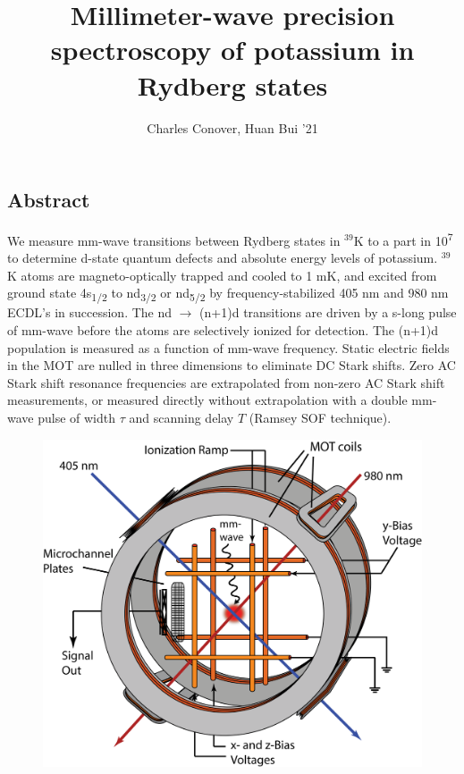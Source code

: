 \documentclass[landscape]{sciposter}
\title{Millimeter-wave precision spectroscopy of potassium in Rydberg states}
\author{Charles Conover, Huan Bui '21}
\institute{Department of Physics and Astronomy, Colby College, Waterville, Maine}
\begin{document}
\renewcommand{\titlesize}{\fontsize{64 pt}{80 pt}\selectfont}
\renewcommand{\authorsize}{\fontsize{40 pt}{50 pt}\selectfont}
\renewcommand{\instsize}{\fontsize{40 pt}{50 pt}\selectfont}
\maketitle

\fontsize{32 pt}{40 pt}\selectfont

\begin{multicols}{4}
\setlength{\columnseprule}{0pt}

\section*{\large Abstract}
{\normalfont We measure mm-wave transitions between Rydberg states in $^{\text{39}}$K to a part in 10\textsuperscript{7} to determine d-state quantum defects and absolute energy levels of potassium. $^{\text{39}}$K atoms are magneto-optically trapped and cooled to 1 mK, and excited from ground state 4s\textsubscript{1/2} to nd\textsubscript{3/2} or nd\textsubscript{5/2} by frequency-stabilized 405 nm and 980 nm ECDL's in succession. The nd $\rightarrow$ (n+1)d transitions are driven by a \textmu s-long pulse of mm-wave before the atoms are selectively ionized for detection. The (n+1)d population is measured as a function of mm-wave frequency. Static electric fields in the MOT are nulled in three dimensions to eliminate DC Stark shifts. Zero AC Stark shift resonance frequencies are extrapolated from non-zero AC Stark shift measurements, or measured directly without extrapolation with a double mm-wave pulse of width $\tau$ and scanning delay $T$ (Ramsey SOF technique).}

\begin{figure}
\begin{center}
\includegraphics[scale = 0.90]{MOT.png}
\end{center}
\end{figure}


\end{multicols}
\end{document}
